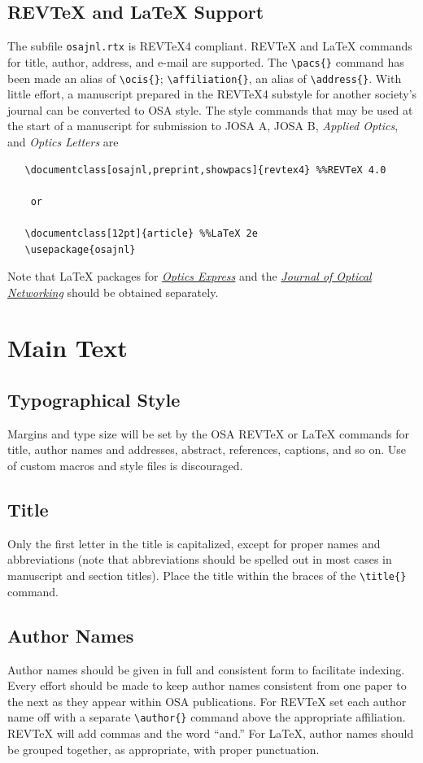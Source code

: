 \documentclass[letterpaper,11pt]{article}   %
\begin{document}
\subsection{REV\TeX{} and \LaTeX{} Support}
The subfile \texttt{osajnl.rtx} is REV\TeX{}4 compliant. REV\TeX{} and
\LaTeX{} commands for title, author, address, and e-mail are
supported. The \verb+\pacs{}+ command has been made an alias of
\verb+\ocis{}+; \verb+\affiliation{}+, an alias of
\verb+\address{}+. With little effort, a manuscript prepared in
the REV\TeX{}4 substyle for another society's journal can be
converted to OSA style. The style commands that may be used at the
start of a manuscript for submission to JOSA A, JOSA B,
\textit{Applied Optics}, and \textit{Optics Letters} are
\begin{verbatim}
   \documentclass[osajnl,preprint,showpacs]{revtex4} %%REVTeX 4.0
    
    or
   
   \documentclass[12pt]{article} %%LaTeX 2e
   \usepackage{osajnl}
\end{verbatim}

Note that \LaTeX{} packages for \href{http://www.opticsexpress.org}{\textit{Optics Express}} and the \href{http://www.osa-jon.org}{\textit{Journal of Optical Networking}} should be obtained separately.


\section{Main Text}
\subsection{Typographical Style}
Margins and type size will be set by the OSA REV\TeX{} or \LaTeX{}
commands for title, author names and addresses, abstract,
references, captions, and so on. Use of custom macros and style
files is discouraged.



\subsection{Title}
Only the first letter in the title is
capitalized, except for proper names and abbreviations (note that
abbreviations should be spelled out in most cases in manuscript
and section titles). Place the title within the braces of the
\verb+\title{}+ command.


\subsection{Author Names}
Author names should be given in full and consistent form to
facilitate indexing. Every effort should be made to keep author
names consistent from one paper to the next as they appear within
OSA publications.  For REV\TeX{} set each author name off with a
separate \verb+\author{}+ command above the appropriate
affiliation. REV\TeX{} will add commas and the word ``and.'' For
\LaTeX, author names should be grouped together, as appropriate,
with proper punctuation.
\end{document}
